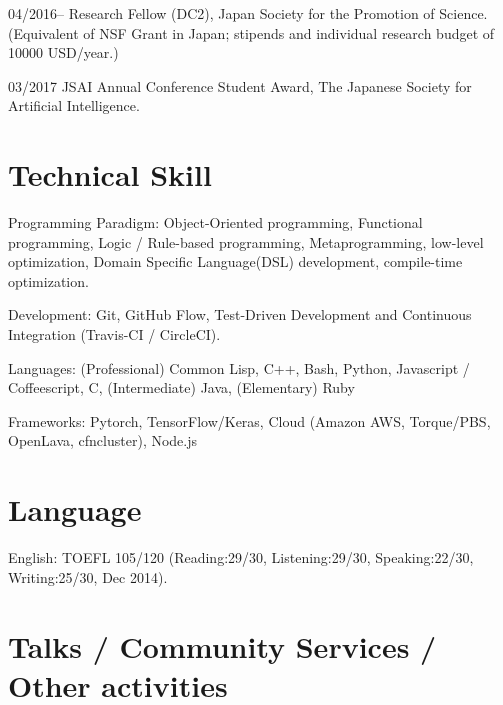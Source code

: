 \documentclass[letterpaper,11pt]{article}
\begin{document}
\begin{CV}
 \item[04/2016--] Research Fellow (DC2), Japan Society for the Promotion of Science.
 (Equivalent of NSF Grant in Japan; stipends and individual research budget of 10000 USD/year.)
 \item[03/2017]
 JSAI Annual Conference Student Award, The Japanese Society for Artificial Intelligence.
\end{CV}

\section{Technical Skill}

\begin{CV}
 \item[Programming Paradigm:] %
 Object-Oriented programming,
 Functional programming,
 Logic / Rule-based programming,
 Metaprogramming, low-level optimization,
 Domain Specific Language(DSL) development, compile-time optimization.
 \item[Development:] Git, GitHub Flow, Test-Driven Development and Continuous Integration (Travis-CI / CircleCI).
 \item[Languages:]
 (Professional) Common Lisp, C++, Bash, Python, Javascript / Coffeescript, C,
 (Intermediate) Java,
 (Elementary)   Ruby
 \item[Frameworks:] Pytorch, TensorFlow/Keras, Cloud (Amazon AWS, Torque/PBS, OpenLava, cfncluster),
 Node.js%
\end{CV}

\section{Language}

\begin{CV}
 \item[English:] TOEFL 105/120 (Reading:29/30, Listening:29/30,
 Speaking:22/30, Writing:25/30, Dec 2014).
\end{CV}

\section{Talks / Community Services / Other activities}
\end{document}
